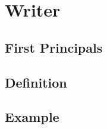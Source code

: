 \section{Writer}
\subsection{First Principals}
\begin{frame}
  
\end{frame}
\subsection{Definition}
\begin{frame}
  
\end{frame}
\subsection{Example}
\begin{frame}
  
\end{frame}

